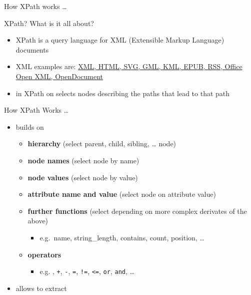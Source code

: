 \documentclass[ignorenonframetext,]{beamer}
\providecommand{\tightlist}{%
  \setlength{\itemsep}{0pt}\setlength{\parskip}{0pt}}
\begin{document}
\begin{frame}[fragile]{How XPath works \ldots{}}

\begin{block}{XPath? What is it all about?}

\begin{itemize}
\tightlist
\item
  XPath is a query language for XML (Extensible Markup Language)
  documents
\item
  XML examples are:
  \href{https://en.wikipedia.org/wiki/List_of_XML_markup_languages}{XML,
  HTML, SVG, GML, KML, EPUB, RSS, Office Open XML, OpenDocument}
\item
  in XPath on selects nodes describing the paths that lead to that path
\end{itemize}

\end{block}

\begin{block}{How XPath Works \ldots{}}

\begin{itemize}
\tightlist
\item
  builds on

  \begin{itemize}
  \tightlist
  \item
    \textbf{hierarchy} (select parent, child, sibling, \ldots{} node)
  \item
    \textbf{node names} (select node by name)
  \item
    \textbf{node values} (select node by value)
  \item
    \textbf{attribute name and value} (select node on attribute value)
  \item
    \textbf{further functions} (select depending on more complex
    derivates of the above)

    \begin{itemize}
    \tightlist
    \item
      e.g.~name, string\_length, contains, count, position, \ldots{}
    \end{itemize}
  \item
    \textbf{operators}

    \begin{itemize}
    \tightlist
    \item
      e.g. \texttt{\textbar{}}, \texttt{+}, \texttt{-}, \texttt{=},
      \texttt{!=}, \texttt{\textless{}=}, \texttt{or}, \texttt{and},
      \ldots{}
    \end{itemize}
  \end{itemize}
\item
  allows to extract


\end{itemize}
\end{block}
\end{frame}
\end{document}
